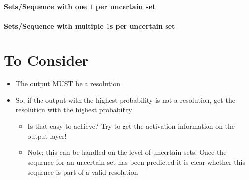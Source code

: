\documentclass[a4paper,12pt]{scrartcl}
\begin{document}
	
	\paragraph*{Sets/Sequence with one $1$ per uncertain set}
	
	
	\paragraph*{Sets/Sequence with multiple $1$s per uncertain set}


\section*{To Consider}
	\begin{itemize}
		\item The output MUST be a resolution
		\item So, if the output with the highest probability is not a resolution, get the resolution with the highest probability
		\begin{itemize}
			\item Is that easy to achieve? Try to get the activation information on the output layer!
			\item Note: this can be handled on the level of uncertain sets. Once the sequence for an uncertain set has been predicted it is clear whether this sequence is part of a valid resolution
		\end{itemize} 
	\end{itemize}
\end{document}

